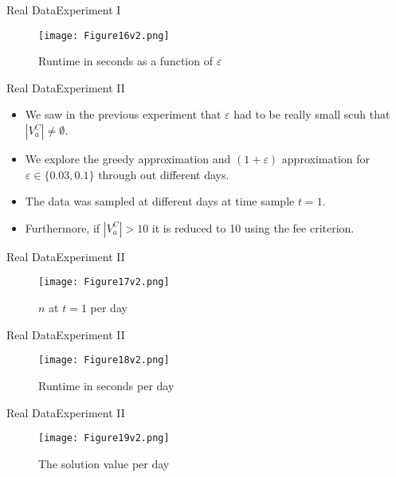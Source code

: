 \documentclass{beamer}
\begin{document}
\begin{frame}{Real Data}{Experiment I}
    \begin{figure}
        \centering
        \texttt{[image: Figure16v2.png]}
        \caption{Runtime in seconds as a function of $\varepsilon$}
    \end{figure}
\end{frame}
\begin{frame}{Real Data}{Experiment II}
    \begin{itemize}
        \item {We saw in the previous experiment that $\varepsilon$ had to 
        be really small scuh that $|V_a^C| \neq \emptyset$.}
        \item {We explore the greedy approximation and $(1+\varepsilon)$ 
        approximation for $\varepsilon \in \{0.03,0.1\}$ through out 
        different days.}
        \item {The data was sampled at different days at time sample $t=1$.}
        \item {Furthermore, if $|V_a^C| > 10$ it is reduced to 10 using the
        fee criterion.}
    \end{itemize}
\end{frame}

\begin{frame}{Real Data}{Experiment II}
    \begin{figure}
        \centering
        \texttt{[image: Figure17v2.png]}
        \caption{$n$ at $t=1$ per day}
    \end{figure}
\end{frame}

\begin{frame}{Real Data}{Experiment II}
    \begin{figure}
        \centering
        \texttt{[image: Figure18v2.png]}
        \caption{Runtime in seconds per day}
    \end{figure}
\end{frame}

\begin{frame}{Real Data}{Experiment II}
    \begin{figure}
        \centering
        \texttt{[image: Figure19v2.png]}
        \caption{The solution value per day}
    \end{figure}
\end{frame}
\end{document}
